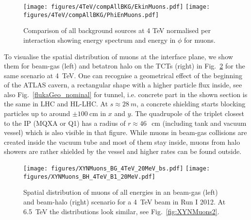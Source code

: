 \begin{figure}%
\begin{center}
  \texttt{[image: figures/4TeV/compAllBKG/EkinMuons.pdf]}
  \texttt{[image: figures/4TeV/compAllBKG/PhiEnMuons.pdf]}
\end{center}
\vspace{-0.6cm}
 \caption{Comparison of all background sources at 4 TeV normalised per interaction showing energy spectrum and energy in $\phi$ for muons.
  \label{fig:compAllBKG_muons}}
\end{figure}
To visualise the spatial distribution of muons at the interface plane, we show them for beam-gas (left) and betatron halo on the TCTs (right) in Fig.~\ref{fig:XYNMuons} for the same scenario at 4~TeV. One can recognise a geometrical effect of the beginning of the ATLAS cavern, a rectangular shape with a higher particle flux inside, see also Fig.~\ref{flukaGeo_nominal} for tunnel, i.e. concrete part in the shown section is the same in LHC and HL-LHC. At $s \approx 28~m$, a concrete shielding starts blocking particles up to around $\pm 100~$cm in $x$ and $y$. The quadrupole of the triplet closest to the IP (MQXA or Q1) has a radius of $r \approx 46~$~cm (including tank and vacuum vessel) which is also visible in that figure. While muons in beam-gas collisions are created inside the vacuum tube and most of them stay inside, muons from halo showers are rather shielded by the vessel and higher rates can be found outside.


\begin{figure} %
  \centering
  \texttt{[image: figures/XYNMuons\_BG\_4TeV\_20MeV\_bs.pdf]}
  \texttt{[image: figures/XYNMuons\_BH\_4TeV\_B1\_20MeV.pdf]}
  \caption{Spatial distribution of muons of all energies in an beam-gas (left) and beam-halo (right) scenario for a 4~TeV beam in Run I 2012. At 6.5~TeV the distributions look similar, see Fig.~\ref{fig:XYNMuons2}.
    \label{fig:XYNMuons}}
\end{figure}


